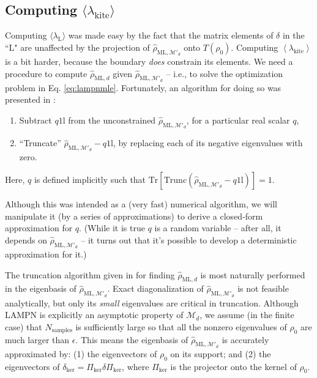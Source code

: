 \documentclass[aps,pra, twocolumn]{revtex4-1}
\newcommand{\M}{\mathcal{M}}
\newcommand{\Tr}{\mathrm{Tr}}
\newcommand{\Id}{\mathbb{I}}
\newcommand{\expect}[1]{\ensuremath{\left\langle#1\right\rangle}}
\def\Id{1\!\mathrm{l}}
\newcommand{\rhohat}{\hat{\rho}}
\newcommand{\rhoML}[1]{\rhohat_{\scriptscriptstyle{\mathrm{ML},#1}}}
\begin{document}
\subsection{Computing $\langle \lambda_\mathrm{kite}\rangle$}
\label{subsec:kite}
Computing $\langle \lambda_{\mathrm{L}}\rangle$ was made easy by the fact that the matrix elements of $\delta$ in the ``L" are unaffected by the projection of $\rhoML{\M'_{d}}$ onto $T(\rho_{0})$. Computing $\expect{\lambda_{\mathrm{kite}}}$ is a bit harder, because the boundary \emph{does} constrain its elements. We need a procedure to compute $\rhoML{d}$ given $\rhoML{\M'_{d}}$ -- i.e., to solve the optimization problem in Eq. \eqref{eq:lampnmle}.  Fortunately, an algorithm for doing so was presented in \cite{Smolin2012}:
\begin{enumerate}[noitemsep]
\item Subtract $q\Id$ from the unconstrained $\rhoML{\M'_{d}}$, for a particular real scalar $q$,
\item ``Truncate'' $\rhoML{\M'_{d}}-q\Id$, by replacing each of its negative eigenvalues with zero.
\end{enumerate}
Here, $q$ is defined implicitly such that $\Tr\left[ \mathrm{Trunc}(\rhoML{\M'_{d}}-q\Id)\right] = 1$.

Although this was intended as a (very fast) numerical algorithm, we will manipulate it (by a series of approximations) to derive a closed-form approximation for $q$. (While it is true $q$ is a random variable -- after all, it depends on $\rhoML{\M'_{d}}$ -- it turns out that it's possible to develop a deterministic approximation for it.)

The truncation algorithm given in \cite{Smolin2012} for finding $\rhoML{d}$ is most naturally performed in the eigenbasis of $\rhoML{\M'_{d}}$.  Exact diagonalization of $\rhoML{\M'_{d}}$ is not feasible analytically, but only its \emph{small} eigenvalues are critical in truncation.  Although  LAMPN is explicitly an asymptotic property of $\M_{d}$, we assume (in the finite case) that $N_{\mathrm{samples}}$ is sufficiently large so that all the nonzero eigenvalues of $\rho_0$ are much larger than $\epsilon$. This means the eigenbasis of $\rhoML{\M'_{d}}$ is accurately approximated by: (1) 
the eigenvectors of $\rho_0$ on its support; and (2) the eigenvectors of $\delta_{\mathrm{ker}} = \Pi_{\mathrm{ker}}\delta\Pi_{\mathrm{ker}}$, where $\Pi_{\mathrm{ker}}
$ is the projector onto the kernel of $\rho_0$.
\end{document}
